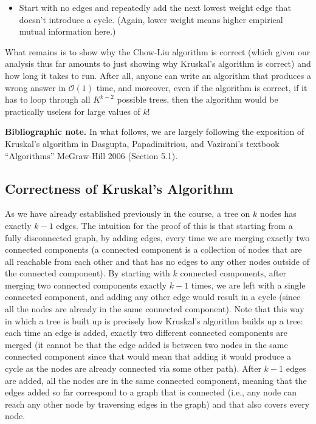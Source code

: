 \begin{itemize}
\item Start with no edges and repeatedly add the next lowest weight edge that doesn't introduce a cycle. (Again, lower weight means higher empirical mutual information here.)
\end{itemize}

What remains is to show why the Chow-Liu algorithm is correct (which given our analysis thus far amounts to just showing why Kruskal's algorithm is correct) and how long it takes to run. After all, anyone can write an algorithm that produces a wrong answer in $\mathcal{O}(1)$ time, and moreover, even if the algorithm is correct, if it has to loop through all $K^{k-2}$ possible trees, then the algorithm would be practically useless for large values of $k$!

\textbf{Bibliographic note.} In what follows, we are largely following the exposition of Kruskal's algorithm in Dasgupta, Papadimitriou, and Vazirani's textbook ``Algorithms'' McGraw-Hill 2006 (Section 5.1).

\subsection{Correctness of Kruskal's Algorithm}

As we have already established previously in the course, a tree on $k$ nodes has exactly $k-1$ edges. The intuition for the proof of this is that starting from a fully disconnected graph, by adding edges, every time we are merging exactly two connected components (a connected component is a collection of nodes that are all reachable from each other and that has no edges to any other nodes outside of the connected component). By starting with $k$ connected components, after merging two connected components exactly $k-1$ times, we are left with a single connected component, and adding any other edge would result in a cycle (since all the nodes are already in the same connected component). Note that this way in which a tree is built up is precisely how Kruskal's algorithm builds up a tree: each time an edge is added, exactly two different connected components are merged (it cannot be that the edge added is between two nodes in the same connected component since that would mean that adding it would produce a cycle as the nodes are already connected via some other path). After $k-1$ edges are added, all the nodes are in the same connected component, meaning that the edges added so far correspond to a graph that is connected (i.e., any node can reach any other node by traversing edges in the graph) and that also covers every node.

